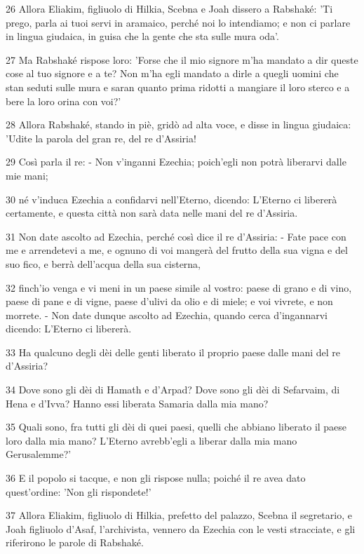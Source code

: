 \par 26 Allora Eliakim, figliuolo di Hilkia, Scebna e Joah dissero a Rabshaké: 'Ti prego, parla ai tuoi servi in aramaico, perché noi lo intendiamo; e non ci parlare in lingua giudaica, in guisa che la gente che sta sulle mura oda'.
\par 27 Ma Rabshaké rispose loro: 'Forse che il mio signore m'ha mandato a dir queste cose al tuo signore e a te? Non m'ha egli mandato a dirle a quegli uomini che stan seduti sulle mura e saran quanto prima ridotti a mangiare il loro sterco e a bere la loro orina con voi?'
\par 28 Allora Rabshaké, stando in piè, gridò ad alta voce, e disse in lingua giudaica: 'Udite la parola del gran re, del re d'Assiria!
\par 29 Così parla il re: - Non v'inganni Ezechia; poich'egli non potrà liberarvi dalle mie mani;
\par 30 né v'induca Ezechia a confidarvi nell'Eterno, dicendo: L'Eterno ci libererà certamente, e questa città non sarà data nelle mani del re d'Assiria.
\par 31 Non date ascolto ad Ezechia, perché così dice il re d'Assiria: - Fate pace con me e arrendetevi a me, e ognuno di voi mangerà del frutto della sua vigna e del suo fico, e berrà dell'acqua della sua cisterna,
\par 32 finch'io venga e vi meni in un paese simile al vostro: paese di grano e di vino, paese di pane e di vigne, paese d'ulivi da olio e di miele; e voi vivrete, e non morrete. - Non date dunque ascolto ad Ezechia, quando cerca d'ingannarvi dicendo: L'Eterno ci libererà.
\par 33 Ha qualcuno degli dèi delle genti liberato il proprio paese dalle mani del re d'Assiria?
\par 34 Dove sono gli dèi di Hamath e d'Arpad? Dove sono gli dèi di Sefarvaim, di Hena e d'Ivva? Hanno essi liberata Samaria dalla mia mano?
\par 35 Quali sono, fra tutti gli dèi di quei paesi, quelli che abbiano liberato il paese loro dalla mia mano? L'Eterno avrebb'egli a liberar dalla mia mano Gerusalemme?'
\par 36 E il popolo si tacque, e non gli rispose nulla; poiché il re avea dato quest'ordine: 'Non gli rispondete!'
\par 37 Allora Eliakim, figliuolo di Hilkia, prefetto del palazzo, Scebna il segretario, e Joah figliuolo d'Asaf, l'archivista, vennero da Ezechia con le vesti stracciate, e gli riferirono le parole di Rabshaké.

